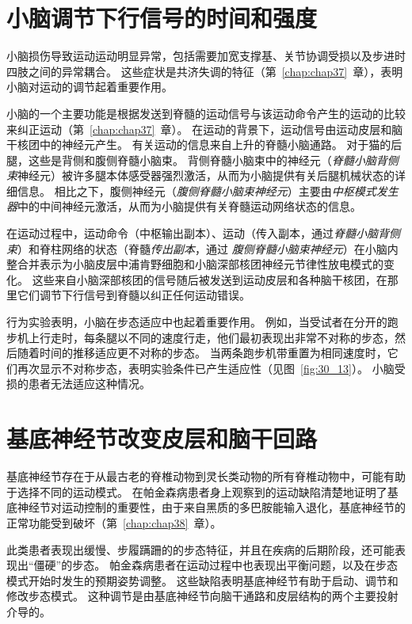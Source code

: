 \section{小脑调节下行信号的时间和强度}

小脑损伤导致运动运动明显异常，包括需要加宽支撑基、关节协调受损以及步进时四肢之间的异常耦合。
这些症状是共济失调的特征（第~\ref{chap:chap37}~章），表明小脑对运动的调节起着重要作用。


小脑的一个主要功能是根据发送到脊髓的运动信号与该运动命令产生的运动的比较来纠正运动（第~\ref{chap:chap37}~章）。
在运动的背景下，运动信号由运动皮层和脑干核团中的神经元产生。
有关运动的信息来自上升的脊髓小脑通路。
对于猫的后腿，这些是背侧和腹侧脊髓小脑束。
背侧脊髓小脑束中的神经元（\textit{脊髓小脑背侧束}神经元）被许多腿本体感受器强烈激活，从而为小脑提供有关后腿机械状态的详细信息。
相比之下，腹侧神经元（\textit{腹侧脊髓小脑束神经元}）主要由\textit{中枢模式发生器}中的中间神经元激活，从而为小脑提供有关脊髓运动网络状态的信息。


在运动过程中，运动命令（中枢输出副本）、运动（传入副本，通过\textit{脊髓小脑背侧束}）和脊柱网络的状态（脊髓\textit{传出副本}，通过 \textit{腹侧脊髓小脑束神经元}）在小脑内整合并表示为小脑皮层中浦肯野细胞和小脑深部核团神经元节律性放电模式的变化。
这些来自小脑深部核团的信号随后被发送到运动皮层和各种脑干核团，在那里它们调节下行信号到脊髓以纠正任何运动错误。


行为实验表明，小脑在步态适应中也起着重要作用。
例如，当受试者在分开的跑步机上行走时，每条腿以不同的速度行走，他们最初表现出非常不对称的步态，然后随着时间的推移适应更不对称的步态。
当两条跑步机带重置为相同速度时，它们再次显示不对称步态，表明实验条件已产生适应性（见图~\ref{fig:30_13}）。
小脑受损的患者无法适应这种情况。



\section{基底神经节改变皮层和脑干回路}

基底神经节存在于从最古老的脊椎动物到灵长类动物的所有脊椎动物中，可能有助于选择不同的运动模式。
在帕金森病患者身上观察到的运动缺陷清楚地证明了基底神经节对运动控制的重要性，由于来自黑质的多巴胺能输入退化，基底神经节的正常功能受到破坏（第~\ref{chap:chap38}~章）。


此类患者表现出缓慢、步履蹒跚的的步态特征，并且在疾病的后期阶段，还可能表现出“僵硬”的步态。
帕金森病患者在运动过程中也表现出平衡问题，以及在步态模式开始时发生的预期姿势调整。
这些缺陷表明基底神经节有助于启动、调节和修改步态模式。
这种调节是由基底神经节向脑干通路和皮层结构的两个主要投射介导的。


